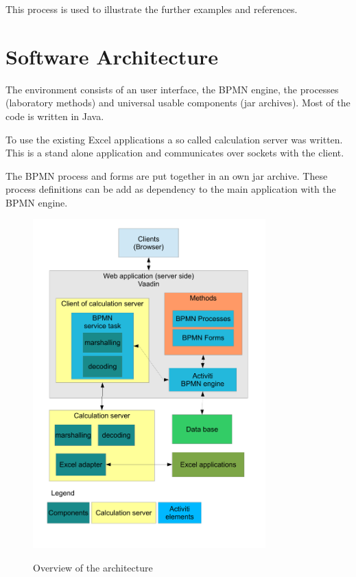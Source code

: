 \documentclass[paper=a4,twoside=false,BCOR=0mm,DIV=calc,fontsize=12pt]{scrartcl}
\begin{document}
This process is used to illustrate the further examples and references.



\section{Software Architecture}
The environment consists of an user interface, the BPMN engine, the processes (laboratory methods) and universal usable components (jar archives). Most of the code is written in Java. 

To use the existing Excel applications a so called calculation server was written. This is a stand alone application and communicates over sockets with the client.

The BPMN process and forms are put together in an own jar archive. These process definitions can be add as dependency to the main application with the BPMN engine.


\begin{figure}
    \begin{center}
      \includegraphics[width=0.8\textwidth]{./img/ArchitectrueOverview.pdf}\\
    \end{center}
  \caption{Overview of the architecture}
  \label{architectureoverview}
\end{figure} 
\end{document}

